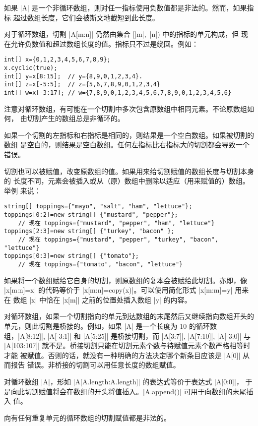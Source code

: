 \documentclass[nofonts,CJKnormalspaces]{ctexbook}[2009/05/20]
\begin{document}
{{{如果 |A| 是一个非循环数组，则对任一指标使用负数值都是非法的。然而，如果指标
超过数组长度，它们会被斯文地截短到此长度。

对于循环数组，切割 |A[m:n]| 仍然由集合 $[$|m|,~|n|$)$ 中的指标的单元构成，但
现在允许负数值和超过数组长度的值。指标只不过是绕回。例如：
\begin{lstlisting}
int[] x={0,1,2,3,4,5,6,7,8,9};
x.cyclic(true);
int[] y=x[8:15];  // y={8,9,0,1,2,3,4}.
int[] z=x[-5:5];  // z={5,6,7,8,9,0,1,2,3,4}
int[] w=x[-3:17]; // w={7,8,9,0,1,2,3,4,5,6,7,8,9,0,1,2,3,4,5,6}
\end{lstlisting}

注意对循环数组，有可能在一个切割中多次包含原数组中相同元素。不论原数组如何，
由切割产生的数组总是非循环的。

如果一个切割的左指标和右指标是相同的，则结果是一个空白数组。如果被切割的数组
是空白的，则结果是空白数组。任何左指标比右指标大的切割都会导致一个错误。

切割也可以被赋值，改变原数组的值。如果用来给切割赋值的数组长度与切割本身的
长度不同，元素会被插入或从（原）数组中删除以适应（用来赋值的）数组。举例
来说：
\begin{lstlisting}
string[] toppings={"mayo", "salt", "ham", "lettuce"};
toppings[0:2]=new string[] {"mustard", "pepper"};
    // 现在 toppings={"mustard", "pepper", "ham", "lettuce"}
toppings[2:3]=new string[] {"turkey", "bacon" };
    // 现在 toppings={"mustard", "pepper", "turkey", "bacon", "lettuce"}
toppings[0:3]=new string[] {"tomato"};
    // 现在 toppings={"tomato", "bacon", "lettuce"}
\end{lstlisting}

如果将一个数组赋给它自身的切割，则原数组的复本会被赋给此切割。亦即，像
|x[m:n]=x| 的代码等价于 |x[m:n]=copy(x)|。可以使用简化形式 |x[m:m]=y| 用来在
数组 |x| 中恰在 |x[m]| 之前的位置处插入数组 |y| 的内容。

对循环数组，如果一个切割指向的单元到达数组的末尾然后又继续指向数组开头的
单元，则此切割是桥接的。例如，如果 |A| 是一个长度为 10 的循环数组，|A[8:12]|,
|A[-3:1]| 和 |A[5:25]| 是桥接切割，而 |A[3:7]|, |A[7:10]|, |A[-3:0]| 与
|A[103:107]| 就不是。桥接切割只能在切割元素个数与待赋值元素个数严格相等时才能
被赋值。否则的话，就没有一种明确的方法决定哪个新条目应该是 |A[0]| 从而报告
错误。非桥接的切割可以用任意长度的数组赋值。

对循环数组 |A|，形如 |A[A.length:A.length]| 的表达式等价于表达式 |A[0:0]|，
于是向此切割赋值将会在数组的开头将值插入。|A.append()| 可用于向数组的末尾插入
值。

向有任何重复单元的循环数组的切割赋值都是非法的。



}}}
\end{document}

